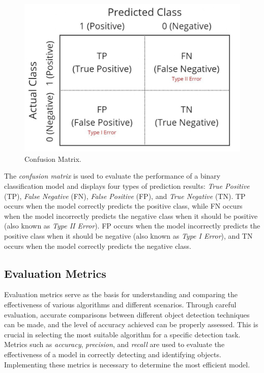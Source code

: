 \begin{figure}[H]
  \centering
  \includegraphics[scale=0.5]{gambar/Matrix Konfusi.jpg}
  \caption{Confusion Matrix.}
  \label{fig:confusion}
\end{figure}

The \emph{confusion matrix} is used to evaluate the performance of a binary classification model and displays four types of prediction results: \emph{True Positive} (TP), \emph{False Negative} (FN), \emph{False Positive} (FP), and \emph{True Negative} (TN). TP occurs when the model correctly predicts the positive class, while FN occurs when the model incorrectly predicts the negative class when it should be positive (also known as \emph{Type II Error}). FP occurs when the model incorrectly predicts the positive class when it should be negative (also known as \emph{Type I Error}), and TN occurs when the model correctly predicts the negative class.

\subsection{Evaluation Metrics}
\label{subsec:Evaluation Metrics}

Evaluation metrics serve as the basis for understanding and comparing the effectiveness of various algorithms and different scenarios. Through careful evaluation, accurate comparisons between different object detection techniques can be made, and the level of accuracy achieved can be properly assessed. This is crucial in selecting the most suitable algorithm for a specific detection task. Metrics such as \emph{accuracy}, \emph{precision}, and \emph{recall} are used to evaluate the effectiveness of a model in correctly detecting and identifying objects. Implementing these metrics is necessary to determine the most efficient model.

